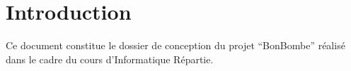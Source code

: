 \section{Introduction}
Ce document constitue le dossier de conception du projet ``BonBombe'' réalisé dans le cadre du cours d'Informatique Répartie.
